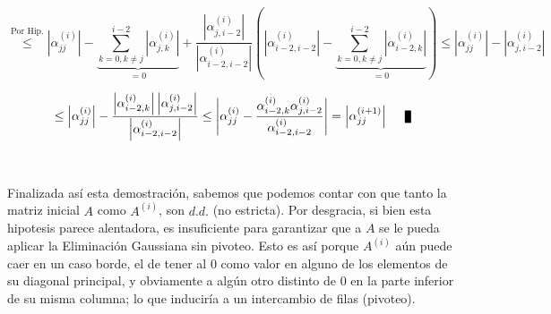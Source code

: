 \begin{equation}
\stackrel{\text{Por Hip.}}{\leq} \left | \alpha_{jj}^{(i)} \right | - \underbrace{\sum_{k=0,k \neq j}^{i-2} \left | \alpha_{j,k}^{(i)} \right |}_{= 0} + \frac{\left | \alpha_{j,i-2}^{(i)} \right |}{\left | \alpha_{i-2,i-2}^{(i)} \right |}\left(\left | \alpha_{i-2,i-2}^{(i)} \right | - \underbrace{\sum_{k=0,k \neq j}^{i-2} \left | \alpha_{i-2,k}^{(i)} \right |}_{= 0} \right) \leq \left | \alpha_{jj}^{(i)} \right | - \left | \alpha_{j,i-2}^{(i)} \right |
\end{equation}

\begin{equation}
\leq \left | \alpha_{jj}^{(i)} \right | - \frac{\left | \alpha_{i-2,k}^{(i)} \right | \left |\alpha_{j,i-2}^{(i)} \right | }{ \left | \alpha_{i-2,i-2}^{(i)} \right | } \leq \left | \alpha_{jj}^{(i)} - \frac{\alpha_{i-2,k}^{(i)}\alpha_{j,i-2}^{(i)}}{\alpha_{i-2,i-2}^{(i)}} \right | = \left | \alpha_{jj}^{(i+1)} \right | \qed
\end{equation}
\\
\\
Finalizada así esta demostraci\'on, sabemos que podemos contar con que tanto la matriz inicial $A$ como $A^{(i)}$, son $d.d.$ (no estricta). Por desgracia, si bien esta hipotesis parece alentadora, es insuficiente para garantizar que a $A$ se le pueda aplicar la Eliminaci\'on Gaussiana sin pivoteo. Esto es así porque $A^{(i)}$ a\'un puede caer en un caso borde, el de tener al $0$ como valor en alguno de los elementos de su diagonal principal, y obviamente a alg\'un otro distinto de $0$ en la parte inferior de su misma columna; lo que induciría a un intercambio de filas (pivoteo).

